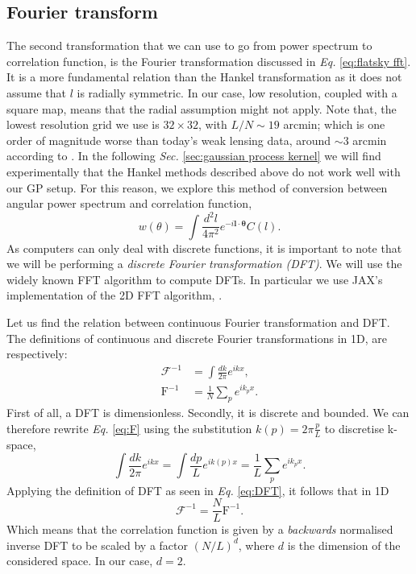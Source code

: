 \subsection{Fourier transform}
The second transformation that we can use to go from power spectrum to correlation function, is the Fourier transformation discussed in \textit{Eq. }\eqref{eq:flatsky fft}. It is a more fundamental relation than the Hankel transformation as it does not assume that $l$ is radially symmetric. In our case, low resolution, coupled with a square map, means that the radial assumption might not apply. Note that, the lowest resolution grid we use is $32\times32$, with $L/N \sim 19$ arcmin; which is one order of magnitude worse than today's weak lensing data, around $\sim 3$ arcmin according to \cite{fwdmodel}.  In the following \textit{Sec. }\ref{sec:gaussian process kernel} we will find experimentally that the Hankel methods described above do not work well with our GP setup. For this reason, we explore this method of conversion between angular power spectrum and correlation function,
\begin{equation}
    w(\theta)=\int\frac{d^2l}{4\pi^2}e^{-i\bm{l}\cdot\bm{\theta}}C(l).
    \label{eq:C-w fft}
\end{equation}
As computers can only deal with discrete functions, it is important to note that we will be performing a \textit{discrete Fourier transformation (DFT)}. We will use the widely known FFT algorithm to compute DFTs. In particular we use JAX's implementation of the 2D FFT algorithm, . 

Let us find the relation between continuous Fourier transformation and DFT. The definitions of continuous and discrete Fourier transformations in 1D, are respectively:
\begin{align} 
    \mathcal{F}^{-1}&=\int\frac{dk}{2\pi}e^{ikx}, \label{eq:F}\\
    \text{F}^{-1}&=\frac{1}{N}\sum_p e^{ik_px}. \label{eq:DFT}
\end{align}
First of all, a DFT is dimensionless. Secondly, it is discrete and bounded. We can therefore rewrite \textit{Eq. }\eqref{eq:F} using the substitution $k(p)=2\pi \frac{p}{L}$ to discretise k-space,
\begin{equation*}
     \int\frac{dk}{2\pi}e^{ikx} = \int\frac{dp}{L} e^{ik(p)x} = \frac{1}{L}\sum_p e^{ik_px}.
\end{equation*}
Applying the definition of DFT as seen in \textit{Eq. }\eqref{eq:DFT}, it follows that in 1D
\begin{equation}
    \mathcal{F}^{-1}=\frac{N}{L}\text{F}^{-1}.
\end{equation}
Which means that the correlation function is given by a \textit{backwards} normalised inverse DFT to be scaled by a factor $(N/L)^d$, where $d$ is the dimension of the considered space. In our case, $d=2$. 

